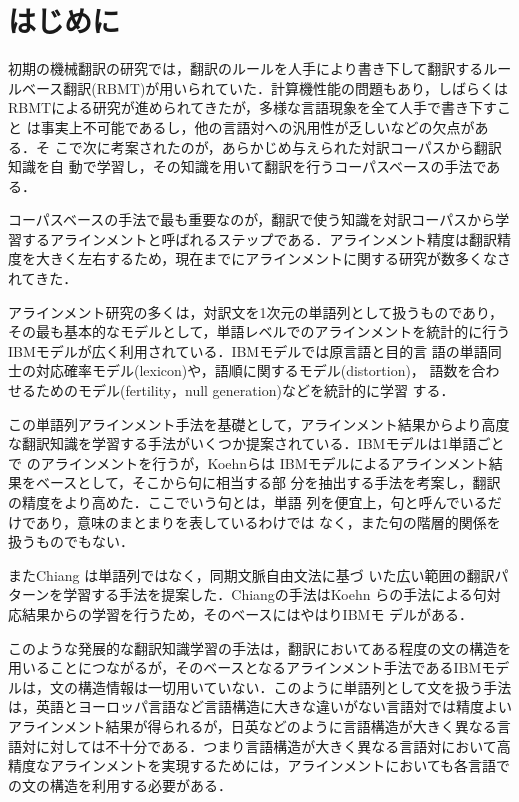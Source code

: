 \documentclass[japanese]{jnlp_1.4}
\begin{document}
\maketitle

\newcommand{\argmax}{}




\section{はじめに}
\label{Introduction}

初期の機械翻訳の研究では，翻訳のルールを人手により書き下して翻訳するルー
ルベース翻訳(RBMT)が用いられていた．計算機性能の問題もあり，しばらくは
RBMTによる研究が進められてきたが，多様な言語現象を全て人手で書き下すこと
は事実上不可能であるし，他の言語対への汎用性が乏しいなどの欠点がある．そ
こで次に考案されたのが，あらかじめ与えられた対訳コーパスから翻訳知識を自
動で学習し，その知識を用いて翻訳を行うコーパスベースの手法である．

コーパスベースの手法で最も重要なのが，翻訳で使う知識を対訳コーパスから学
習するアラインメントと呼ばれるステップである．アラインメント精度は翻訳精
度を大きく左右するため，現在までにアラインメントに関する研究が数多くなさ
れてきた．

アラインメント研究の多くは，対訳文を1次元の単語列として扱うものであり，
その最も基本的なモデルとして，単語レベルでのアラインメントを統計的に行う
IBMモデル\cite{Brown93}が広く利用されている．IBMモデルでは原言語と目的言
語の単語同士の対応確率モデル(lexicon)や，語順に関するモデル(distortion)，
語数を合わせるためのモデル(fertility，null generation)などを統計的に学習
する．

この単語列アラインメント手法を基礎として，アラインメント結果からより高度
な翻訳知識を学習する手法がいくつか提案されている．IBMモデルは1単語ごとで
のアラインメントを行うが，Koehnら\cite{koehn-och-marcu:2003:HLTNAACL}は
IBMモデルによるアラインメント結果をベースとして，そこから句に相当する部
分を抽出する手法を考案し，翻訳の精度をより高めた．ここでいう句とは，単語
列を便宜上，句と呼んでいるだけであり，意味のまとまりを表しているわけでは
なく，また句の階層的関係を扱うものでもない．

またChiang \cite{chiang:2005:ACL}は単語列ではなく，同期文脈自由文法に基づ
いた広い範囲の翻訳パターンを学習する手法を提案した．Chiangの手法はKoehn
らの手法による句対応結果からの学習を行うため，そのベースにはやはりIBMモ
デルがある．

このような発展的な翻訳知識学習の手法は，翻訳においてある程度の文の構造を
用いることにつながるが，そのベースとなるアラインメント手法であるIBMモデ
ルは，文の構造情報は一切用いていない．このように単語列として文を扱う手法
は，英語とヨーロッパ言語など言語構造に大きな違いがない言語対では精度よい
アラインメント結果が得られるが，日英などのように言語構造が大きく異なる言
語対に対しては不十分である．つまり言語構造が大きく異なる言語対において高
精度なアラインメントを実現するためには，アラインメントにおいても各言語で
の文の構造を利用する必要がある．
\end{document}
